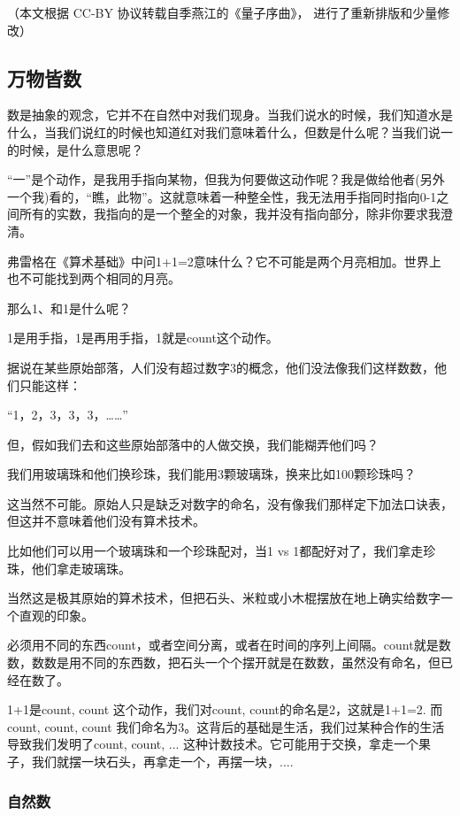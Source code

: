 
（本文根据 CC-BY 协议转载自季燕江的《量子序曲》， 进行了重新排版和少量修改）

\subsection{万物皆数}

数是抽象的观念，它并不在自然中对我们现身。当我们说水的时候，我们知道水是什么，当我们说红的时候也知道红对我们意味着什么，但数是什么呢？当我们说一的时候，是什么意思呢？

“一”是个动作，是我用手指向某物，但我为何要做这动作呢？我是做给他者(另外一个我)看的，“瞧，此物”。这就意味着一种整全性，我无法用手指同时指向0-1之间所有的实数，我指向的是一个整全的对象，我并没有指向部分，除非你要求我澄清。

弗雷格在《算术基础》中问1+1=2意味什么？它不可能是两个月亮相加。世界上也不可能找到两个相同的月亮。

那么1、和1是什么呢？

1是用手指，1是再用手指，1就是count这个动作。

据说在某些原始部落，人们没有超过数字3的概念，他们没法像我们这样数数，他们只能这样：

“1，2，3，3，3，……”

但，假如我们去和这些原始部落中的人做交换，我们能糊弄他们吗？

我们用玻璃珠和他们换珍珠，我们能用3颗玻璃珠，换来比如100颗珍珠吗？

这当然不可能。原始人只是缺乏对数字的命名，没有像我们那样定下加法口诀表，但这并不意味着他们没有算术技术。

比如他们可以用一个玻璃珠和一个珍珠配对，当1 vs 1都配好对了，我们拿走珍珠，他们拿走玻璃珠。

当然这是极其原始的算术技术，但把石头、米粒或小木棍摆放在地上确实给数字一个直观的印象。

必须用不同的东西count，或者空间分离，或者在时间的序列上间隔。count就是数数，数数是用不同的东西数，把石头一个个摆开就是在数数，虽然没有命名，但已经在数了。

1+1是count, count 这个动作，我们对count, count的命名是2，这就是1+1=2. 而count, count, count 我们命名为3。这背后的基础是生活，我们过某种合作的生活导致我们发明了count, count, ... 这种计数技术。它可能用于交换，拿走一个果子，我们就摆一块石头，再拿走一个，再摆一块，....

\subsubsection{自然数}

